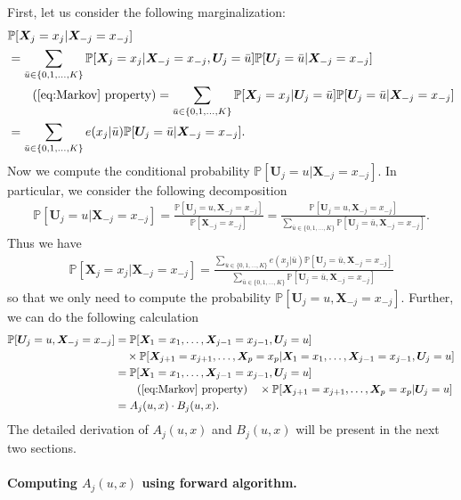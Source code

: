 \documentclass[12pt]{article}
\theoremstyle{definition}
\def\P{\mathbb{P}}
\def\P{\mathbb{P}}
\renewcommand{\P}{\mathbb{P}}							%
\newcommand{\prx}{\bm X}								%
\newcommand{\pru}{{\bm U}}								%
\begin{document}
First, let us consider the following marginalization:
\begin{align*}
	&
	\P[\bm X_j=x_j|\bm X_{-j}=x_{-j}]\\
	&
	=\sum_{\bar u\in \{0,1,\ldots,K\}}\P[\prx_j=x_j|\prx_{-j}=x_{-j},\pru_{j}=\bar u]\P[\pru_j=\bar u|\prx_{-j}=x_{-j}]\\
	&\tag{\ref{eq:Markov} property}
	=\sum_{\bar u\in \{0,1,\ldots,K\}}\P[\bm X_j=x_j|\pru_{j}=\bar u]\P[\pru_j=\bar u|\bm X_{-j}=x_{-j}]\\
	&
	=\sum_{\bar u\in \{0,1,\ldots,K\}}e(x_j|\bar u)\P[\pru_j=\bar u|\bm X_{-j}=x_{-j}].
\end{align*}
Now we compute the conditional probability $\P[\pru_j=u|\bm X_{-j}=x_{-j}]$. In particular, we consider the following decomposition
\begin{align*}
	\P[\pru_j=u|\bm X_{-j}=x_{-j}]=\frac{\P[\pru_j=u,\bm X_{-j}=x_{-j}]}{\P[\bm X_{-j}=x_{-j}]}=\frac{\P[\pru_j=u,\bm X_{-j}=x_{-j}]}{\sum_{\bar u\in \{0,1,\ldots,K\}}\P[\pru_j=\bar u,\bm X_{-j}=x_{-j}]}.
\end{align*}
Thus we have 
\begin{align*}
	\P[\bm X_j=x_j|\bm X_{-j}=x_{-j}]=\frac{\sum_{\bar u\in \{0,1,\ldots,K\}}e(x_j|\bar u)\P[\pru_j=\bar u,\bm X_{-j}=x_{-j}]}{\sum_{\bar u\in \{0,1,\ldots,K\}}\P[\pru_j=\bar u,\bm X_{-j}=x_{-j}]}
\end{align*}
so that we only need to compute the probability $\P[\pru_j=u,\bm X_{-j}=x_{-j}]$. Further, we can do the following calculation 
\begin{align*}
	\P[\pru_j=u,\bm X_{-j}=x_{-j}]
	&
	=\P[\bm X_{1}=x_1,\ldots, \prx_{j-1}=x_{j-1},\pru_{j}=u]\\
	&
	\quad\times\P[\prx_{j+1}=x_{j+1},\ldots, \prx_{p}=x_{p}|\prx_{1}=x_1,\ldots, \prx_{j-1}=x_{j-1},\pru_{j}=u]\\
	&
	=\P[\prx_{1}=x_1,\ldots, \prx_{j-1}=x_{j-1},\pru_{j}=u]\\
	&\tag{\ref{eq:Markov} property}
	\quad\times \P[\bm X_{j+1}=x_{j+1},\ldots, \prx_{p}=x_{p}|\pru_{j}=u]\\
	&
	= A_{j}(u,x)\cdot B_j(u,x).
\end{align*}
The detailed derivation of $A_j(u,x)$ and $B_j(u,x)$ will be present in the next two sections.

\paragraph{Computing $A_j(u,x)$ using forward algorithm.}
\end{document}
